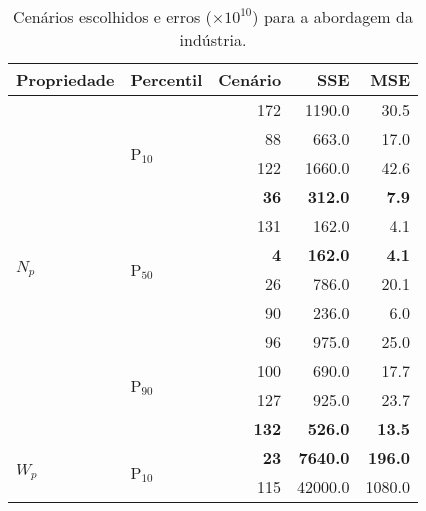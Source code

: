 \begin{table}[H]
  \centering
  \caption[Erros dos cenários selecionados usando a abordagem da indústria.]{Cenários escolhidos e erros ($\times 10^{10}$) para a abordagem da indústria.}
  \begin{tabular}{llrrr}
    \hline
    \textbf{Propriedade}       & \textbf{Percentil}       & \textbf{Cenário} & \textbf{SSE}      & \textbf{MSE}   \\ \hline
    \multirow{12}{*}{$N_p$} & \multirow{4}{*}{P$_{10}$} & 172               & 1190.0          & 30.5           \\
                            &                           & 88                & 663.0          & 17.0           \\
                            &                           & 122               & 1660.0          & 42.6           \\
                            &                           & \textbf{36}       & \textbf{312.0} & \textbf{7.9}   \\ \cline{2-5} 
                            & \multirow{4}{*}{P$_{50}$} & 131               & 162.0          & 4.1            \\
                            &                           & \textbf{4}        & \textbf{162.0} & \textbf{4.1}   \\
                            &                           & 26                & 786.0          & 20.1           \\
                            &                           & 90                & 236.0          & 6.0            \\ \cline{2-5} 
                            & \multirow{4}{*}{P$_{90}$} & 96                & 975.0          & 25.0           \\
                            &                           & 100               & 690.0          & 17.7           \\
                            &                           & 127               & 925.0          & 23.7           \\
                            &                           & \textbf{132}      & \textbf{526.0} & \textbf{13.5}  \\ \hline
    \multirow{12}{*}{$W_p$} & \multirow{4}{*}{P$_{10}$} & \textbf{23}       & \textbf{7640.0} & \textbf{196.0} \\
                            &                           & 115               & 42000.0          & 1080.0         \\

\end{tabular}
\end{table}
